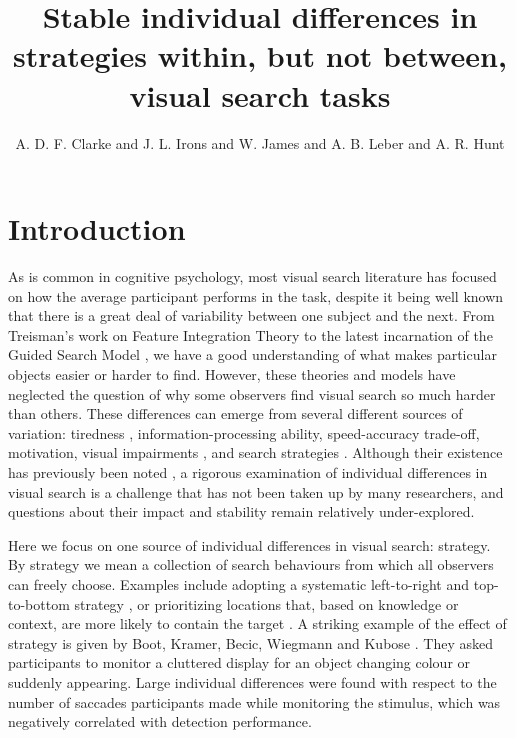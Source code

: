 \documentclass[Afour, sageapa, times]{sagej}
\title{Stable individual differences in strategies within, but not between, visual search tasks}
\author{A. D. F. Clarke\affilnum{1} and J. L. Irons\affilnum{2} and W. James\affilnum{3} and A. B. Leber\affilnum{2} and A. R. Hunt\affilnum{3}}
\affiliation{\affilnum{1}Department of Psychology, University of Essex, Colchester, UK \\ 
\affilnum{2}Department of Psychology, The Ohio State University, Columbus, USA \\ 
\affilnum{3}School of Psychology, University of Aberdeen, Aberdeen, UK}
\begin{document}
\maketitle

\section{Introduction}

As is common in cognitive psychology, most visual search literature has focused on how the average participant performs in the task, despite it being well known that there is a great deal of variability between one subject and the next. From Treisman's work on Feature Integration Theory \cite{treisman1980} to the latest incarnation of the Guided Search Model \cite{wolfe2015}, we have a good understanding of what makes particular objects easier or harder to find. However, these theories and models have neglected the question of why some observers find visual search so much harder than others. These differences can emerge from several different sources of variation: tiredness \cite{mackworth1948}, information-processing ability, speed-accuracy trade-off, motivation, visual impairments \cite{nowakowska2016}, and search strategies \cite{boot2006}. Although their existence has previously been noted \cite{mackworth1948, clarke2019}, a rigorous examination of individual differences in visual search is a challenge that has not been taken up by many researchers, and questions about their impact and stability remain relatively under-explored. 


Here we focus on one source of individual differences in visual search: strategy. By strategy we mean a collection of search behaviours from which all observers can freely choose. Examples include adopting a systematic left-to-right and top-to-bottom strategy \cite{gilchrist2006}, or prioritizing locations that, based on knowledge or context, are more likely to contain the target \cite{wolfe2015}. A striking example of the effect of strategy is given by Boot, Kramer, Becic, Wiegmann and Kubose \citeyear{boot2006}. They asked participants to monitor a cluttered display for an object changing colour or suddenly appearing. Large individual differences were found with respect to the number of saccades participants made while monitoring the stimulus, which was negatively correlated with detection performance. 
\end{document}

